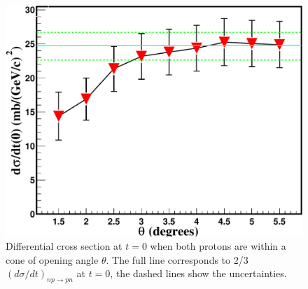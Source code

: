 \documentclass[epj]{svjour}
\begin{document}
\begin{figure}
  \centering
  \includegraphics[width=1.00\columnwidth]{fig7.pdf}
  \caption{Differential cross section at $t=0$ when both protons are within a
    cone of opening angle $\theta$. The full line corresponds to 2/3
    $(d\sigma/dt)_{np\to pn}$ at $t=0$, the dashed lines show the
    uncertainties.}
\end{figure}
\end{document}
